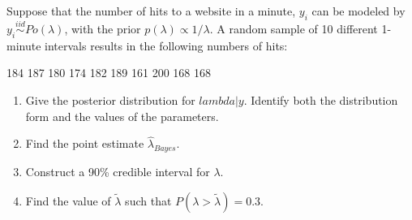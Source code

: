  \item 
    Suppose that the number of hits to a website in a minute, $y_i$ can be modeled by $y_i\stackrel{iid}{\sim}Po(\lambda)$, with the prior  $p(\lambda) \propto 1/ \lambda$. A random sample of 10 different 1-minute intervals results in the following numbers of hits: 
    
    184	187	180	174	182	189	161	200	168	168
    
    \begin{enumerate}
      \item Give the posterior distribution for $ lambda | y$. Identify both the distribution form and the values of the parameters. 
      \item Find the point estimate $\hat{\lambda}_{Bayes}$. 
      \item Construct a 90\% credible interval for $\lambda$. 
      \item Find the value of $\tilde{\lambda}$ such that $P(\lambda>\tilde{\lambda})=0.3$.
\end{enumerate}

